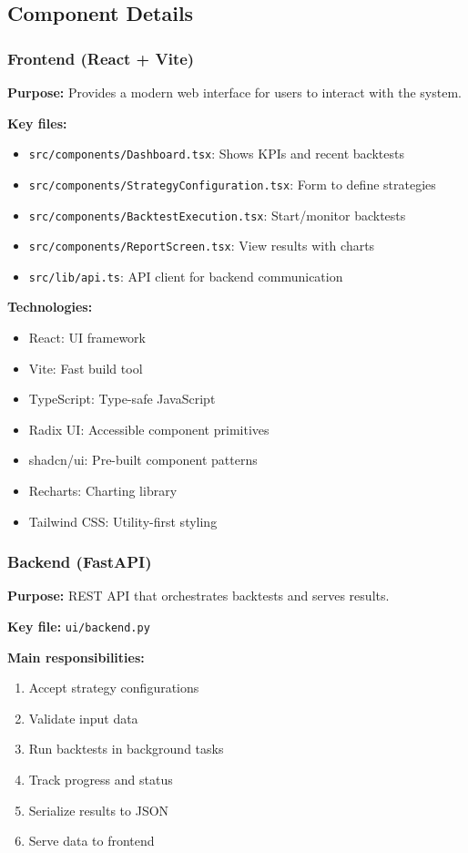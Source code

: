 \documentclass[11pt,a4paper]{article}
\begin{document}
\subsection{Component Details}

\subsubsection{Frontend (React + Vite)}

\textbf{Purpose:} Provides a modern web interface for users to interact with the system.

\textbf{Key files:}
\begin{itemize}
  \item \texttt{src/components/Dashboard.tsx}: Shows KPIs and recent backtests
  \item \texttt{src/components/StrategyConfiguration.tsx}: Form to define strategies
  \item \texttt{src/components/BacktestExecution.tsx}: Start/monitor backtests
  \item \texttt{src/components/ReportScreen.tsx}: View results with charts
  \item \texttt{src/lib/api.ts}: API client for backend communication
\end{itemize}

\textbf{Technologies:}
\begin{itemize}
  \item React: UI framework
  \item Vite: Fast build tool
  \item TypeScript: Type-safe JavaScript
  \item Radix UI: Accessible component primitives
  \item shadcn/ui: Pre-built component patterns
  \item Recharts: Charting library
  \item Tailwind CSS: Utility-first styling
\end{itemize}

\subsubsection{Backend (FastAPI)}

\textbf{Purpose:} REST API that orchestrates backtests and serves results.

\textbf{Key file:} \texttt{ui/backend.py}

\textbf{Main responsibilities:}
\begin{enumerate}
  \item Accept strategy configurations
  \item Validate input data
  \item Run backtests in background tasks
  \item Track progress and status
  \item Serialize results to JSON
  \item Serve data to frontend
\end{enumerate}
\end{document}

